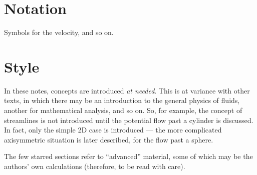 \section{Notation}

Symbols for the velocity, and so on.

\section{Style}

In these notes, concepts are introduced \emph{at needed}. This is at
variance with other texts, in which there may be an introduction to
the general physics of fluids, another for mathematical analysis, and
so on. So, for example, the concept of streamlines is not introduced
until the potential flow past a cylinder is discussed. In fact, only
the simple 2D case is introduced --- the more complicated axisymmetric
situation is later described, for the flow past a sphere.

The few starred sections refer to ``advanced'' material, some of which
may be the authors' own calculations (therefore, to be read with
care).
